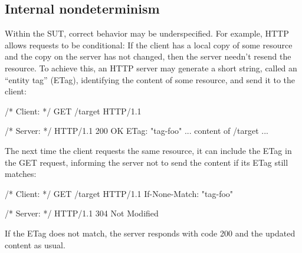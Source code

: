 \subsection{Internal nondeterminism}
\label{sec:internal-nondeterminism}
Within the SUT, correct behavior may be \mbox{underspecified}.  For example,
HTTP~\cite{rfc7232} allows requests to be conditional: If the client has a local
copy of some resource and the copy on the server has not changed, then the
server needn't resend the resource.  To achieve this, an HTTP server may
generate a short string, called an ``entity tag'' (ETag), identifying the
content of some resource, and send it to the client:
\begin{center}
  \begin{minipage}[t]{.4\textwidth}
    \begin{cpp}
/* Client: */
GET /target HTTP/1.1
    \end{cpp}
  \end{minipage}\begin{minipage}[t]{.4\textwidth}
    \begin{cpp}
/* Server: */
HTTP/1.1 200 OK
ETag: "tag-foo"
... content of /target ...
    \end{cpp}
  \end{minipage}
\end{center}
The next time the client requests the same resource, it can include the ETag in
the GET request, informing the server not to send the content if its ETag still
matches:
\begin{center}
\begin{minipage}[t]{.4\textwidth}
\begin{cpp}
/* Client: */
GET /target HTTP/1.1
If-None-Match: "tag-foo"
\end{cpp}
\end{minipage}\begin{minipage}[t]{.4\textwidth}
\begin{cpp}
/* Server: */
HTTP/1.1 304 Not Modified
\end{cpp}
\end{minipage}
\end{center}
If the ETag does not match, the server responds with code 200 and the updated
content as usual.

